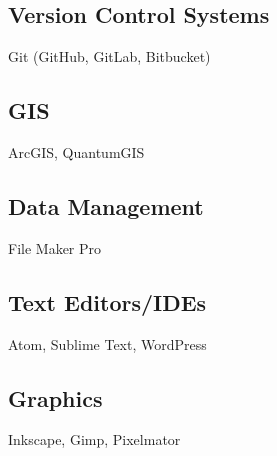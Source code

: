 
\subsection{Version Control Systems}
Git (GitHub, GitLab, Bitbucket)

\subsection{GIS}
ArcGIS, QuantumGIS

\subsection{Data Management}
File Maker Pro

\subsection{Text Editors/IDEs}
Atom, Sublime Text, WordPress

\subsection{Graphics}
Inkscape, Gimp, Pixelmator
